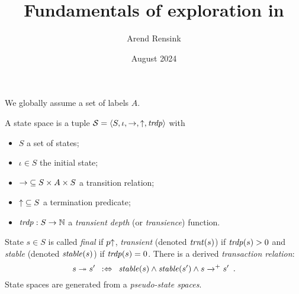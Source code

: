 \documentclass{article}
\begin{document}
\title{Fundamentals of exploration in \GROOVE}
\author{Arend Rensink}
\date{August 2024}
\maketitle

\medskip\noindent
We globally assume a set of labels $A$.

\medskip\noindent 
A state space is a tuple $\mathcal{S}=\langle{S,\iota,{\rightarrow},{{\uparrow}},\ensuremath{\mathit{trdp}}}\rangle$ with
\begin{itemize}
\item $S$ a set of states;
\item $\iota\in S$ the initial state;
\item ${\rightarrow}\subseteq S\times A\times S$ a transition relation;
\item ${{\uparrow}}\subseteq S$ a termination predicate;
\item ${\mathit{trdp}}:S\to \mathbb{N}$ a \emph{transient depth} (or \emph{transience}) function.
\end{itemize}
%
State $s\in S$ is called \emph{final} if $p{\uparrow}$, \emph{transient} (denoted $\mathit{trnt}(s)$) if $\mathit{trdp}(s)>0$ and \emph{stable} (denoted $\mathit{stable}(s)$) if $\mathit{trdp}(s)=0$. There is a derived \emph{transaction relation}:
%
\[ s\ttrans s' \enspace\iffdef\enspace \Stable(s) \wedge \Stable(s') \wedge s\trans{}^+ s' \enspace. \]
%
State spaces are generated from a \emph{pseudo-state spaces}.
\end{document}
